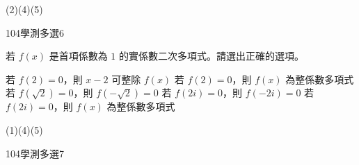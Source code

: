 \begin{QUESTIONS}
\begin{QUESTION}
\begin{QANS}
            (2)(4)(5)
        \end{QANS}
        \begin{QSOLLIST}
        \end{QSOLLIST}
        \begin{QEMPTYSPACE}
        \end{QEMPTYSPACE}
    \end{QUESTION}
    \begin{QUESTION}
        \begin{ExamInfo}{104}{學測}{多選}{6}
        \end{ExamInfo}
        \begin{ExamAnsRateInfo}{45}{74}{43}{18}
        \end{ExamAnsRateInfo}
        \begin{QBODY}
            若 $f\left( x \right)$ 是首項係數為 $1$ 的實係數二次多項式。請選出正確的選項。
			\begin{QOPS}
				\QOP 若 $f\left( 2 \right)=0$，則 $x-2$ 可整除 $f\left( x \right)$
				\QOP 若 $f\left( 2 \right)=0$，則 $f\left( x \right)$ 為整係數多項式
				\QOP 若 $f\left( \sqrt{2} \right)=0$，則 $f\left( -\sqrt{2} \right)=0$
				\QOP 若 $f\left( 2i \right)=0$，則 $f\left( -2i \right)=0$
				\QOP 若 $f\left( 2i \right)=0$，則 $f\left( x \right)$ 為整係數多項式
			\end{QOPS}
        \end{QBODY}
        \begin{QFROMS}
        \end{QFROMS}
        \begin{QTAGS}\end{QTAGS}
        \begin{QANS}
            (1)(4)(5)
        \end{QANS}
        \begin{QSOLLIST}
        \end{QSOLLIST}
        \begin{QEMPTYSPACE}
        \end{QEMPTYSPACE}
    \end{QUESTION}
    \begin{QUESTION}
        \begin{ExamInfo}{104}{學測}{多選}{7}
        \end{ExamInfo}
        \begin{ExamAnsRateInfo}{67}{92}{77}{32}
        \end{ExamAnsRateInfo}
        \begin{QBODY}

\end{QBODY}
\end{QUESTION}
\end{QUESTIONS}
